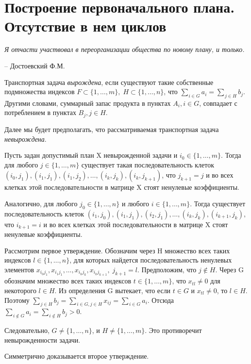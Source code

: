 \chapter{Построение первоначального плана. Отсутствие в нем циклов}
\label{cha:21}

\epigraph{
	\textit{Я отчасти участвовал в переорганизации общества по новому плану, и только.}}
{-- Достоевский Ф.М.}

\begin{definition}\label{cha:21/def:1}
	Транспортная задача \textit{вырождена}, если существуют такие собственные подмножества индексов $\displaystyle F \subset \{1, \dots, m\}, \; H \subset \{1, \dots, n\}$, что $\underset{i \in G}{\overset{}{\sum}}a_i = \underset{j \in H}{\overset{}{\sum}}b_j$. Другими словами, суммарный запас продукта в пунктах $A_i, i \in G$, совпадает с потреблением в пунктах $B_j, j \in H$.
\end{definition}

Далее мы будет предполагать, что рассматриваемая транспортная задача \textit{невырождена}.

\begin{propose}\label{cha:21/propose:1}
	Пусть задан допустимый план X невырожденной задачи и $i_0 \in \{1, \dots, m\}$. Тогда для любого $j \in \{1, \dots,m\}$ существует такая последовательность клеток $(i_0, j_1), (i_1, j_1), (i_1, j_2), \dots, (i_k, j_k), (i_k, j_{k+1})$, что $j_{k+1} = j$ и во всех клетках этой последовательности в матрице X стоят ненулевые коэффициенты.
	
	Аналогично, для любого $j_0 \in \{1, \dots, n\}$ и любого $i \in \{1, \dots, m\}$. Тогда существует последовательность клеток $(i_1, j_0), (i_1, j_1), (i_2, j_1), \dots, (i_k, j_k), (i_{k+1}, j_k)$, \\ что $i_{k+1} = i$ и во всех клетках этой последовательности в матрице X стоят ненулевые коэффициенты.
\end{propose}
\begin{Proof}
	Рассмотрим первое утверждение. Обозначим через H множество всех таких индексов $l \in \{1, \dots, n\}$, для которых найдется последовательность ненулевых элементов $x_{i_0j_1}, x_{i_1j_1}, \dots, x_{i_kj_k}, x_{i_kj_{k+1}}, \; j_{k+1} = l$. Предположим, что $j \not \in H$. Через G обозначим множество всех таких индексов $t \in \{1, \dots, m\}$, что $x_{tl} \not = 0$ для некоторого $l \in H$. Из определения G вытекает, что если $t \in G$ и $x_{tl} \not = 0$, то $l \in H$. Поэтому $\displaystyle \underset{j \in H}{\overset{}{\sum}}b_j = \underset{i \in G, j \in H}{\overset{}{\sum}}x_{ij} = \underset{i \in G}{\overset{}{\sum}}a_i$. Отсюда $\displaystyle \underset{i \not \in G}{\overset{}{\sum}}a_i = \underset{i \not \in H}{\overset{}{\sum}}b_j > 0$.

	Следовательно, $G \not = \{1, \dots, n\}$, и $H \not = \{1, \dots, m\}$. Это противоречит невырожденности задачи.
	
	Симметрично доказывается второе утверждение.
\end{Proof}

